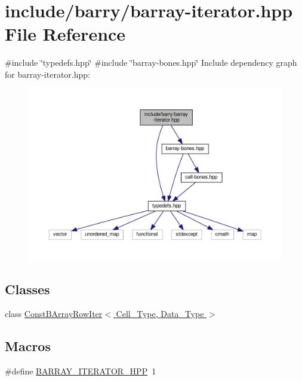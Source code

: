 \hypertarget{barray-iterator_8hpp}{}\section{include/barry/barray-\/iterator.hpp File Reference}
\label{barray-iterator_8hpp}
{\ttfamily \#include \char`\"{}typedefs.\+hpp\char`\"{}}\newline
{\ttfamily \#include \char`\"{}barray-\/bones.\+hpp\char`\"{}}\newline
Include dependency graph for barray-\/iterator.hpp\+:\nopagebreak
\begin{figure}[H]
\begin{center}
\leavevmode
\includegraphics[width=350pt]{barray-iterator_8hpp__incl}
\end{center}
\end{figure}
\subsection*{Classes}
\begin{DoxyCompactItemize}
\item 
class \hyperlink{class_const_b_array_row_iter}{Const\+B\+Array\+Row\+Iter$<$ Cell\+\_\+\+Type, Data\+\_\+\+Type $>$}
\end{DoxyCompactItemize}
\subsection*{Macros}
\begin{DoxyCompactItemize}
\item 
\#define \hyperlink{barray-iterator_8hpp_af7d28058e98dd1797def3cd230abe121}{B\+A\+R\+R\+A\+Y\+\_\+\+I\+T\+E\+R\+A\+T\+O\+R\+\_\+\+H\+PP}~1
\end{DoxyCompactItemize}


